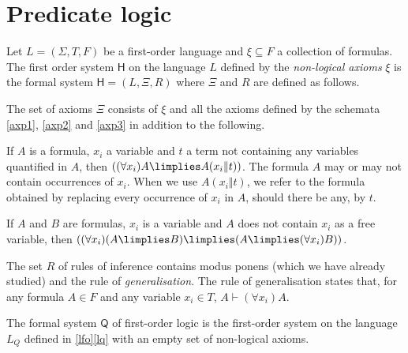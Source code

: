 
\section{Predicate logic}

\begin{definition}
Let $L = (\Sigma, T, F)$ be a first-order language and $\xi\subseteq F$ a collection of formulas.
The first order system $\mathsf{H}$ on the language $L$ defined by the \emph{non-logical axioms} $\xi$ is the formal system $\mathsf{H} = (L,\Xi,R)$ where $\Xi$ and $R$ are defined as follows.

The set of axioms $\Xi$ consists of $\xi$ and all the axioms defined by the schemata \ref{axp1}, \ref{axp2} and \ref{axp3} in addition to the following.
\begin{axioms}[Q]
\item \label{axq1} If $A$ is a formula, $x_i$ a variable and $t$ a term not containing any variables quantified in $A$, then $((\forall x_i) A \limplies A(x_i\Vert t))$.
The formula $A$ may or may not contain occurrences of $x_i$.
When we use $A(x_i\Vert t)$, we refer to the formula obtained by replacing every occurrence of $x_i$ in $A$, should there be any, by $t$.
\item \label{axq2} If $A$ and $B$ are formulas, $x_i$ is a variable and $A$ does not contain $x_i$ as a free variable, then $((\forall x_i)(A\limplies B)\limplies (A\limplies (\forall x_i) B))$.
\end{axioms}

The set $R$ of rules of inference contains modus ponens (which we have already studied) and the rule of \emph{generalisation}. The rule of generalisation states that, for any formula $A\in F$ and any variable $x_i\in T$, $A\vdash (\forall x_i) A$.

The formal system $\mathsf{Q}$ of first-order logic is the first-order system on the language $L_Q$ defined in \ref{lfo}\ref{lq} with an empty set of non-logical axioms.
\end{definition}

